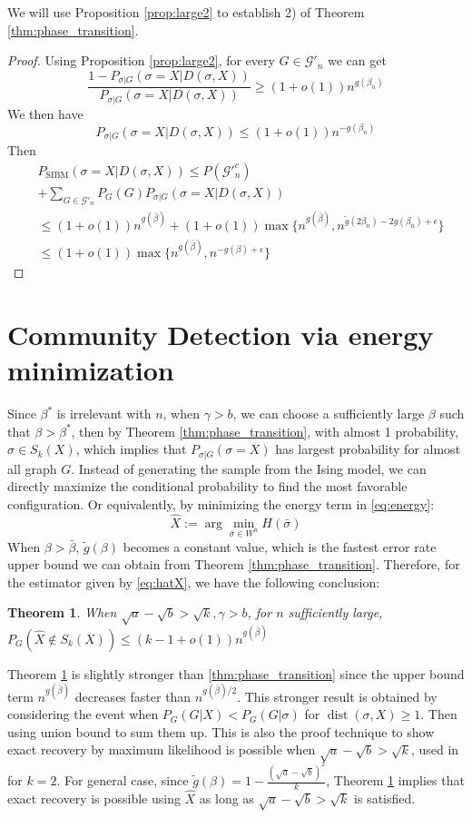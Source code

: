 \documentclass[journal]{IEEEtran}
\newtheorem{theorem}{Theorem}
\newcommand{\cG}{\mathcal{G}}
\newcommand{\1}{\mathbbm{1}}
\DeclareMathOperator{\SIBM}{SIBM}
\DeclareMathOperator{\dist}{dist}
\begin{document}
We will use Proposition \ref{prop:large2} to establish 2) of Theorem \ref{thm:phase_transition}.
\begin{proof}
	Using Proposition \ref{prop:large2}, for every $G \in \cG'_n$
	we can get
	$$
	\frac{1-P_{\sigma | G}(\sigma=X | D(\sigma, X))}{P_{\sigma | G}(\sigma=X | D(\sigma, X))}\geq (1+o(1))n^{g(\beta_n)}
	$$
	We then have
	$$
	P_{\sigma | G}(\sigma=X| D(\sigma, X)) \leq (1+o(1)) n^{-g(\beta_n)}
	$$
	Then
	\begin{align*}
	&P_{\SIBM}(\sigma=X| D(\sigma, X))  \leq  P(\cG'^c_n) \\
	&+ \sum_{G\in \cG'_n}P_G(G) P_{\sigma|G}(\sigma=X| D(\sigma, X)) \\
	& \leq (1+o(1))n^{g(\bar{\beta})} + (1+o(1)) \max\{n^{g(\bar{\beta})}, n^{\tilde{g}(2\beta_n) - 2g(\beta_n) + \epsilon} \}\\
	& \leq (1+o(1)) \max\{n^{g(\bar{\beta})}, n^{-g(\beta) + \epsilon}  \}
	\end{align*}
\end{proof}
\section{Community Detection via energy minimization}
Since $\beta^*$ is irrelevant with $n$, when $\gamma>b$, we can choose a sufficiently large $\beta$ such that
$\beta > \beta^*$, then by Theorem \ref{thm:phase_transition}, with almost 1 probability, $\sigma \in S_k(X)$, which
implies that $P_{\sigma | G}(\sigma = X)$ has largest probability for almost all graph $G$. Instead of generating
the sample from the Ising model, we can directly maximize the conditional probability to find the most favorable
configuration. Or equivalently, by minimizing the energy term in \eqref{eq:energy}:
\begin{equation}\label{eq:hatX}
\hat{X} := \arg\min_{\bar{\sigma} \in W^n} H(\bar{\sigma})
\end{equation}
When $\beta > \bar{\beta}$, $\tilde{g}(\beta)$ becomes a constant value, which is the fastest error rate upper bound we can obtain
from Theorem \ref{thm:phase_transition}. Therefore, for the estimator given by \eqref{eq:hatX}, we have the following
conclusion:
\begin{theorem}\label{thm:error_rate}
When $\sqrt{a} - \sqrt{b} > \sqrt{k}, \gamma > b$, for $n$ sufficiently large, $P_G(\hat{X} \not\in S_k(X)) \leq (k-1+o(1))n^{g(\bar{\beta})}$
\end{theorem}
Theorem \ref{thm:error_rate} is slightly stronger than \ref{thm:phase_transition} since the upper bound term
$n^{g(\bar{\beta})}$ decreases
faster than $n^{g(\bar{\beta})/2}$. This stronger result is obtained by considering the event when $P_G(G | X) < P_G(G | \sigma)$
for $\dist(\sigma, X) \geq 1$. Then using union bound to sum them up. This is also the proof technique to show exact recovery by maximum likelihood is possible
when $\sqrt{a} - \sqrt{b} > \sqrt{k}$, used in \cite{abbe2015exact} for $k=2$. For general case, since $\tilde{g}(\beta) = 1- \frac{(\sqrt{a} - \sqrt{b})^2}{k}$, Theorem \ref{thm:error_rate} implies that exact recovery is possible using $\hat{X}$ as long as  
$\sqrt{a} - \sqrt{b} > \sqrt{k}$ is satisfied.
\end{document}
